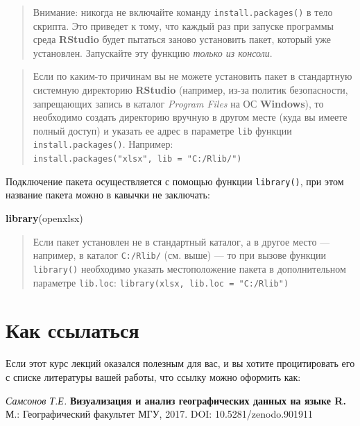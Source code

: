 \documentclass[]{book}
\newenvironment{Shaded}{\begin{snugshade}}{\end{snugshade}}
\newcommand{\KeywordTok}[1]{\textcolor[rgb]{0.13,0.29,0.53}{\textbf{#1}}}
\newcommand{\NormalTok}[1]{#1}
\begin{document}
\begin{quote}
Внимание: никогда не включайте команду \texttt{install.packages()} в
тело скрипта. Это приведет к тому, что каждый раз при запуске программы
среда \textbf{RStudio} будет пытаться заново установить пакет, который
уже установлен. Запускайте эту функцию \emph{только из консоли}.
\end{quote}

\begin{quote}
Если по каким-то причинам вы не можете установить пакет в стандартную
системную директорию \textbf{RStudio} (например, из-за политик
безопасности, запрещающих запись в каталог \emph{Program Files} на ОС
\textbf{Windows}), то необходимо создать директорию вручную в другом
месте (куда вы имеете полный доступ) и указать ее адрес в параметре
\texttt{lib} функции \texttt{install.packages()}. Например:
\texttt{install.packages("xlsx",\ lib\ =\ "C:/Rlib/")}
\end{quote}

Подключение пакета осуществляется с помощью функции \texttt{library()},
при этом название пакета можно в кавычки не заключать:

\begin{Shaded}
\begin{Highlighting}[]
\KeywordTok{library}\NormalTok{(openxlsx)}
\end{Highlighting}
\end{Shaded}

\begin{quote}
Если пакет установлен не в стандартный каталог, а в другое место ---
например, в каталог \texttt{С:/Rlib/} (см. выше) --- то при вызове
функции \texttt{library()} необходимо указать местоположение пакета в
дополнительном параметре \texttt{lib.loc}:
\texttt{library(xlsx,\ lib.loc\ =\ "C:/Rlib")}
\end{quote}

\section*{Как ссылаться}\label{-}

Если этот курс лекций оказался полезным для вас, и вы хотите
процитировать его с списке литературы вашей работы, что ссылку можно
оформить как:

\emph{Самсонов Т.Е.} \textbf{Визуализация и анализ географических данных
на языке R.} М.: Географический факультет МГУ, 2017. DOI:
10.5281/zenodo.901911
\end{document}
